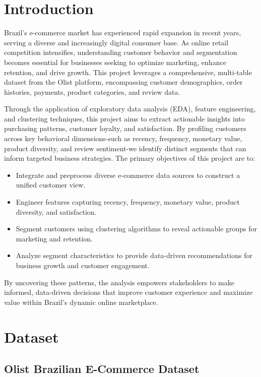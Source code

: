 \documentclass[a4paper]{article}
\begin{document}
 
\begin{multicols}{2}
\setlength{\columnsep}{0.5cm}

\section{Introduction}

Brazil’s e-commerce market has experienced rapid expansion in recent years, serving a diverse and increasingly digital consumer base. As online retail competition intensifies, understanding customer behavior and segmentation becomes essential for businesses seeking to optimize marketing, enhance retention, and drive growth. This project leverages a comprehensive, multi-table dataset from the Olist platform, encompassing customer demographics, order histories, payments, product categories, and review data.

Through the application of exploratory data analysis (EDA), feature engineering, and clustering techniques, this project aims to extract actionable insights into purchasing patterns, customer loyalty, and satisfaction. By profiling customers across key behavioral dimensions-such as recency, frequency, monetary value, product diversity, and review sentiment-we identify distinct segments that can inform targeted business strategies.
The primary objectives of this project are to:
\begin{itemize}
\item Integrate and preprocess diverse e-commerce data sources to construct a unified customer view.
\item Engineer features capturing recency, frequency, monetary value, product diversity, and satisfaction.
\item Segment customers using clustering algorithms to reveal actionable groups for marketing and retention.
\item Analyze segment characteristics to provide data-driven recommendations for business growth and customer engagement.
\end{itemize}

By uncovering these patterns, the analysis empowers stakeholders to make informed, data-driven decisions that improve customer experience and maximize value within Brazil’s dynamic online marketplace.
\section{Dataset}

\subsection{Olist Brazilian E-Commerce Dataset}


\end{multicols}
\end{document}
